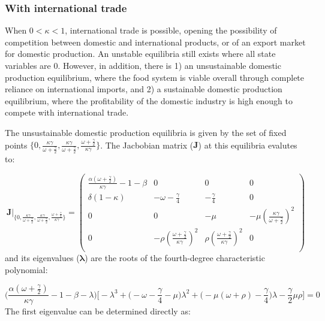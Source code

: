 \documentclass[12pt]{article}
\begin{document}
\subsubsection{With international trade}
When $0 < \kappa < 1$, international trade is possible, opening the possibility of competition between domestic and international products, or of an export market for domestic production. An unstable equilibria still exists where all state variables are 0. However, in addition, there is 1) an unsustainable domestic production equilibrium, where the food system is viable overall through complete reliance on international imports, and 2) a sustainable domestic production equilibrium, where the profitability of the domestic industry is high enough to compete with international trade.

The unsustainable domestic production equilibria is given by the set of fixed points $\{0, \frac{\kappa \gamma}{\omega + \frac{\gamma}{2}}, \frac{\kappa \gamma}{\omega + \frac{\gamma}{2}}, \frac{\omega + \frac{\gamma}{2}}{\kappa \gamma}\}$. The Jacbobian matrix ($\boldsymbol{J}$) at this equilibria evalutes to:

\begin{equation}
  \boldsymbol{J} \Big |_{\big \{0, \frac{\kappa \gamma}{\omega + \frac{\gamma}{2}}, \frac{\kappa \gamma}{\omega + \frac{\gamma}{2}}, \frac{\omega + \frac{\gamma}{2}}{\kappa \gamma}\big \}} =
  \begin{pmatrix}
    \frac{\alpha(\omega + \frac{\gamma}{2})}{\kappa \gamma} - 1 - \beta   &    0     &     0    &  0 \\
    \delta (1 - \kappa) & - \omega - \frac{\gamma}{4}  &  - \frac{\gamma}{4} & 0 \\
    0      &           0            & -\mu     & - \mu (\frac{\kappa \gamma}{\omega + \frac{\gamma}{2}})^2\\
    0      &   - \rho (\frac{\omega + \frac{\gamma}{2}}{\kappa \gamma})^2    & \rho (\frac{\omega + \frac{\gamma}{2}}{\kappa \gamma})^2 & 0 \\
  \end{pmatrix}
\end{equation}
%
and its eigenvalues ($\boldsymbol{\lambda}$) are the roots of the fourth-degree characteristic polynomial:

\begin{equation}
  \Big(\frac{\alpha(\omega + \frac{\gamma}{2})}{\kappa \gamma} - 1 - \beta - \lambda\Big) \Big[ - \lambda^3 + \big(-\omega - \frac{\gamma}{4} - \mu\big) \lambda^2 + \big(- \mu(\omega + \rho) - \frac{\gamma}{4}\big) \lambda - \frac{\gamma}{2} \mu \rho\Big] = 0
\end{equation}
%
The first eigenvalue can be determined directly as:
\end{document}
